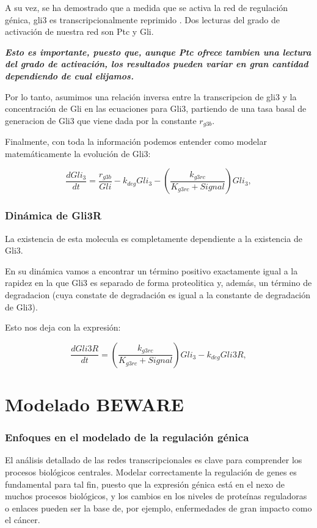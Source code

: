  A su vez, se ha demostrado que a medida que se activa la red de regulación génica, gli3 es transcripcionalmente
 reprimido \cite{wang2000hedgehog}. Dos lecturas del grado de activación de nuestra red son Ptc y Gli. 
 
 \textbf{\textit{Esto es importante, puesto que, aunque Ptc ofrece tambien una lectura del grado de activación, los resultados pueden variar en gran cantidad dependiendo de cual elijamos.}}
 
 Por lo tanto, asumimos una relación inversa entre la transcripcion de gli3 y la concentración de Gli en las ecuaciones para Gli3, partiendo de una tasa basal de generacion de Gli3 que viene dada por la constante $r_{g3b}$. 
 
 Finalmente, con toda la información podemos entender como modelar matemáticamente la evolución de Gli3:
 
  \begin{equation}
  \frac{dGli_3}{dt} = \frac{r_{g3b}}{Gli}-k_{deg}Gli_3-\left(\frac{k_{g3rc}}{K_{g3rc}+Signal}\right)Gli_3,
  \end{equation}
 
 \subsubsection{Dinámica de Gli3R}
 La existencia de esta molecula es completamente dependiente a la existencia de Gli3.
 
 En su dinámica vamos a encontrar un término positivo exactamente igual a la rapidez en la que Gli3 es separado de forma proteolitica y, además, un término de degradacion (cuya constate de degradación es igual a la constante de degradación de Gli3).
 
  Esto nos deja con la expresión:

 
 \begin{equation}
 \frac{dGli3R}{dt}= \left(\frac{k_{g3rc}}{K_{g3rc}+Signal}\right)Gli_3-k_{deg}Gli3R,
 \end{equation}
 
 \section{Modelado BEWARE}
 
 \subsubsection{Enfoques en el modelado de la regulación génica}
 
 El análisis detallado de las redes transcripcionales es clave para comprender los procesos biológicos centrales. Modelar correctamente la regulación de genes es fundamental para tal fin, puesto que la expresión génica está en el nexo de muchos procesos biológicos, y los cambios en los niveles de proteínas reguladoras o enlaces pueden ser la base de, por ejemplo, enfermedades de gran impacto como el cáncer. 
 
